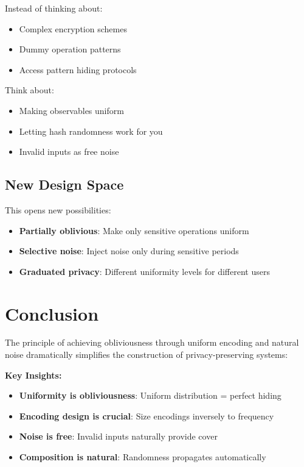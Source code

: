\documentclass[11pt,final]{article}
\begin{document}
Instead of thinking about:
\begin{itemize}
    \item Complex encryption schemes
    \item Dummy operation patterns
    \item Access pattern hiding protocols
\end{itemize}

Think about:
\begin{itemize}
    \item Making observables uniform
    \item Letting hash randomness work for you
    \item Invalid inputs as free noise
\end{itemize}

\subsection{New Design Space}

This opens new possibilities:
\begin{itemize}
    \item \textbf{Partially oblivious}: Make only sensitive operations uniform
    \item \textbf{Selective noise}: Inject noise only during sensitive periods
    \item \textbf{Graduated privacy}: Different uniformity levels for different users
\end{itemize}

\section{Conclusion}

The principle of achieving obliviousness through uniform encoding and natural noise dramatically simplifies the construction of privacy-preserving systems:

\textbf{Key Insights:}
\begin{itemize}
    \item \textbf{Uniformity is obliviousness}: Uniform distribution = perfect hiding
    \item \textbf{Encoding design is crucial}: Size encodings inversely to frequency
    \item \textbf{Noise is free}: Invalid inputs naturally provide cover
    \item \textbf{Composition is natural}: Randomness propagates automatically
\end{itemize}
\end{document}
